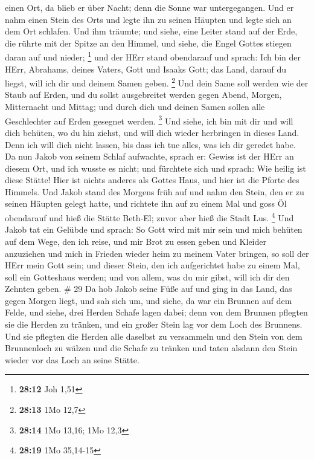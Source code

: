 einen Ort, da blieb er über Nacht; denn die Sonne war untergegangen. Und
er nahm einen Stein des Orts und legte ihn zu seinen Häupten und legte
sich an dem Ort schlafen.  Und ihm träumte; und siehe, eine
Leiter stand auf der Erde, die rührte mit der Spitze an den Himmel, und
siehe, die Engel Gottes stiegen daran auf und nieder; \footnote{\textbf{28:12}
  Joh 1,51}  und der HErr stand obendarauf und sprach: Ich
bin der HErr, Abrahams, deines Vaters, Gott und Isaaks Gott; das Land,
darauf du liegst, will ich dir und deinem Samen geben. \footnote{\textbf{28:13}
  1Mo 12,7}  Und dein Same soll werden wie der Staub auf
Erden, und du sollst ausgebreitet werden gegen Abend, Morgen,
Mitternacht und Mittag; und durch dich und deinen Samen sollen alle
Geschlechter auf Erden gesegnet werden. \footnote{\textbf{28:14} 1Mo
  13,16; 1Mo 12,3}  Und siehe, ich bin mit dir und will
dich behüten, wo du hin ziehst, und will dich wieder herbringen in
dieses Land. Denn ich will dich nicht lassen, bis dass ich tue alles,
was ich dir geredet habe.  Da nun Jakob von seinem Schlaf
aufwachte, sprach er: Gewiss ist der HErr an diesem Ort, und ich wusste
es nicht;  und fürchtete sich und sprach: Wie heilig ist
diese Stätte! Hier ist nichts anderes als Gottes Haus, und hier ist die
Pforte des Himmels.  Und Jakob stand des Morgens früh auf
und nahm den Stein, den er zu seinen Häupten gelegt hatte, und richtete
ihn auf zu einem Mal und goss Öl obendarauf  und hieß die
Stätte Beth-El; zuvor aber hieß die Stadt Lus. \footnote{\textbf{28:19}
  1Mo 35,14-15}  Und Jakob tat ein Gelübde und sprach: So
Gott wird mit mir sein und mich behüten auf dem Wege, den ich reise, und
mir Brot zu essen geben und Kleider anzuziehen  und mich in
Frieden wieder heim zu meinem Vater bringen, so soll der HErr mein Gott
sein;  und dieser Stein, den ich aufgerichtet habe zu einem
Mal, soll ein Gotteshaus werden; und von allem, was du mir gibst, will
ich dir den Zehnten geben. \# 29  Da hob Jakob seine Füße
auf und ging in das Land, das gegen Morgen liegt,  und sah
sich um, und siehe, da war ein Brunnen auf dem Felde, und siehe, drei
Herden Schafe lagen dabei; denn von dem Brunnen pflegten sie die Herden
zu tränken, und ein großer Stein lag vor dem Loch des Brunnens.
 Und sie pflegten die Herden alle daselbst zu versammeln und
den Stein von dem Brunnenloch zu wälzen und die Schafe zu tränken und
taten alsdann den Stein wieder vor das Loch an seine Stätte.
